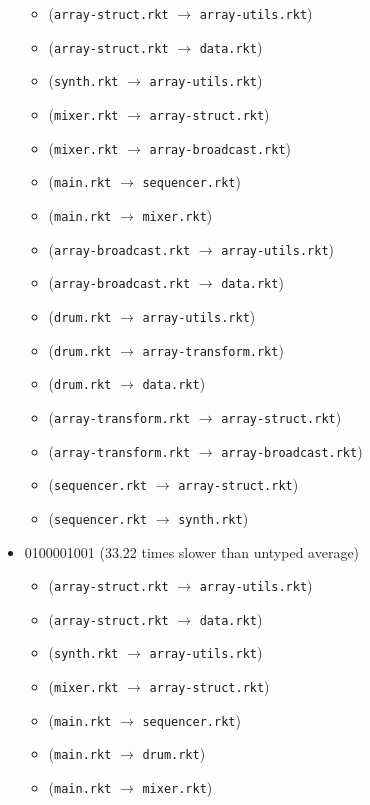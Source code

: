 \documentclass{article}
\newcommand{\mono}[1]{\texttt{#1}}
\begin{document}
\begin{itemize}
  \begin{itemize}
  \item (\mono{array-struct.rkt} $\rightarrow$ \mono{array-utils.rkt})
  \item (\mono{array-struct.rkt} $\rightarrow$ \mono{data.rkt})
  \item (\mono{synth.rkt} $\rightarrow$ \mono{array-utils.rkt})
  \item (\mono{mixer.rkt} $\rightarrow$ \mono{array-struct.rkt})
  \item (\mono{mixer.rkt} $\rightarrow$ \mono{array-broadcast.rkt})
  \item (\mono{main.rkt} $\rightarrow$ \mono{sequencer.rkt})
  \item (\mono{main.rkt} $\rightarrow$ \mono{mixer.rkt})
  \item (\mono{array-broadcast.rkt} $\rightarrow$ \mono{array-utils.rkt})
  \item (\mono{array-broadcast.rkt} $\rightarrow$ \mono{data.rkt})
  \item (\mono{drum.rkt} $\rightarrow$ \mono{array-utils.rkt})
  \item (\mono{drum.rkt} $\rightarrow$ \mono{array-transform.rkt})
  \item (\mono{drum.rkt} $\rightarrow$ \mono{data.rkt})
  \item (\mono{array-transform.rkt} $\rightarrow$ \mono{array-struct.rkt})
  \item (\mono{array-transform.rkt} $\rightarrow$ \mono{array-broadcast.rkt})
  \item (\mono{sequencer.rkt} $\rightarrow$ \mono{array-struct.rkt})
  \item (\mono{sequencer.rkt} $\rightarrow$ \mono{synth.rkt})
  \end{itemize}
\item 0100001001 (33.22 times slower than untyped average)
  \begin{itemize}
  \item (\mono{array-struct.rkt} $\rightarrow$ \mono{array-utils.rkt})
  \item (\mono{array-struct.rkt} $\rightarrow$ \mono{data.rkt})
  \item (\mono{synth.rkt} $\rightarrow$ \mono{array-utils.rkt})
  \item (\mono{mixer.rkt} $\rightarrow$ \mono{array-struct.rkt})
  \item (\mono{main.rkt} $\rightarrow$ \mono{sequencer.rkt})
  \item (\mono{main.rkt} $\rightarrow$ \mono{drum.rkt})
  \item (\mono{main.rkt} $\rightarrow$ \mono{mixer.rkt})

\end{itemize}
\end{itemize}
\end{document}
